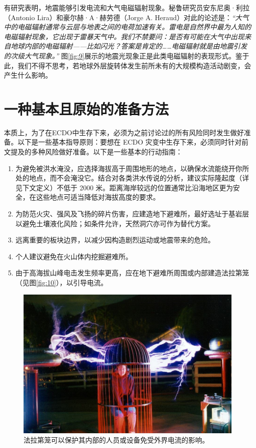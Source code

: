 \documentclass[10pt,twocolumn,letterpaper]{article}
\begin{document}
有研究表明，地震能够引发电流和大气电磁辐射现象\cite{49,50}。秘鲁研究员安东尼奥·利拉（Antonio Lira）和豪尔赫·A·赫劳德（Jorge A. Heraud）对此的论述是：\textit{“大气中的电磁辐射通常与云层与地表之间的电荷加速有关。雷电是自然界中最为人知的电磁辐射现象，它出现于雷暴天气中。我们不禁要问：是否有可能在大气中出现来自地球内部的电磁辐射——比如闪光？答案是肯定的……电磁辐射就是由地震引发的次级大气现象。”} \cite{50}图\ref{fig:9}展示的地震光现象正是此类电磁辐射的表现形式。鉴于此，我们不得不思考，若地球外层旋转体发生前所未有的大规模构造活动剧变，会产生什么影响。
\section{一种基本且原始的准备方法}

本质上，为了在ECDO中生存下来，必须为之前讨论过的所有风险同时发生做好准备。以下是一些基本指导原则：要想在 ECDO 灾变中生存下来，必须同时针对前文提及的多种风险做好准备。以下是一些基本的行动指南：

\begin{flushleft}
\begin{enumerate}
    \item 为避免被洪水淹没，应选择海拔高于周围地形的地点，以确保水流能绕开你所处的地点，而不会淹没它。结合对各类洪水传说的分析，建议实际隆起度（详见下文定义）不低于 2000 米。距离海岸较远的位置通常比沿海地区更为安全，在这些地点可适当降低对海拔高度的要求。
    \item 为防范火灾、强风及飞扬的碎片伤害，应建造地下避难所，最好选址于基岩层以避免土壤液化风险；如条件允许，天然洞穴亦可作为替代方案。
    \item 远离重要的板块边界，以减少因构造剧烈运动或地震带来的危险。
    \item 个人建议避免在火山体内挖掘避难所。
    \item 由于高海拔山峰电击发生频率更高，应在地下避难所周围或内部建造法拉第笼（见图\ref{fig:10}），以引导电流。
\end{enumerate}
\end{flushleft}

\begin{figure}[t]
\begin{center}
   \includegraphics[width=1\linewidth]{faraday.jpg}
\end{center}
   \caption{法拉第笼可以保护其内部的人员或设备免受外界电流的影响\cite{54}。}
\label{fig:10}
\label{fig:onecol}
\end{figure}
\end{document}
